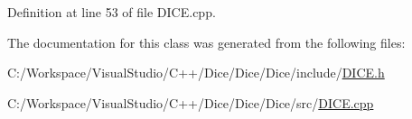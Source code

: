 Definition at line 53 of file D\+I\+C\+E.\+cpp.



The documentation for this class was generated from the following files\+:\begin{DoxyCompactItemize}
\item 
C\+:/\+Workspace/\+Visual\+Studio/\+C++/\+Dice/\+Dice/\+Dice/include/\mbox{\hyperlink{_d_i_c_e_8h}{D\+I\+C\+E.\+h}}\item 
C\+:/\+Workspace/\+Visual\+Studio/\+C++/\+Dice/\+Dice/\+Dice/src/\mbox{\hyperlink{_d_i_c_e_8cpp}{D\+I\+C\+E.\+cpp}}\end{DoxyCompactItemize}
